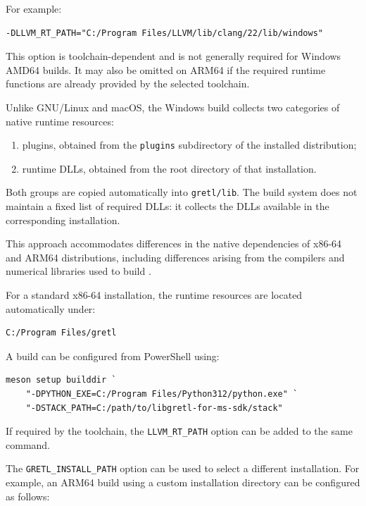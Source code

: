 For example:

\begin{verbatim}
-DLLVM_RT_PATH="C:/Program Files/LLVM/lib/clang/22/lib/windows"
\end{verbatim}

This option is toolchain-dependent and is not generally
required for Windows AMD64 builds. It may also be omitted
on ARM64 if the required runtime functions are already
provided by the selected toolchain.

Unlike GNU/Linux and macOS, the Windows build collects
two categories of native runtime resources:

\begin{enumerate}
	\item \gretl plugins, obtained from the
	\texttt{plugins} subdirectory of the installed
	\gretl distribution;
	
	\item runtime DLLs, obtained from the root
	directory of that installation.
\end{enumerate}

Both groups are copied automatically into
\texttt{gretl/lib}. The build system does not maintain
a fixed list of required DLLs: it collects the DLLs
available in the corresponding installation.

This approach accommodates differences in the native
dependencies of x86-64 and ARM64 distributions,
including differences arising from the compilers and
numerical libraries used to build \lgretl.

For a standard x86-64 installation, the \gretl
runtime resources are located automatically under:

\begin{verbatim}
C:/Program Files/gretl
\end{verbatim}

A build can be configured from PowerShell using:

\begin{verbatim}
meson setup builddir `
	"-DPYTHON_EXE=C:/Program Files/Python312/python.exe" `
	"-DSTACK_PATH=C:/path/to/libgretl-for-ms-sdk/stack"
\end{verbatim}

If required by the toolchain, the
\texttt{LLVM\_RT\_PATH} option can be added to the
same command.

The \texttt{GRETL\_INSTALL\_PATH} option can be used
to select a different \gretl installation. For example,
an ARM64 build using a custom installation directory
can be configured as follows:

